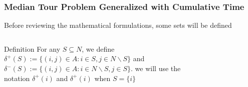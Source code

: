 \documentclass[aspectratio=169]{beamer}
\begin{document}
\begin{frame}
\frametitle{Median Tour Problem Generalized with Cumulative Time}
Before reviewing the mathematical formulations, some sets will be defined
\begin{columns}
\begin{block}{Definition}
For any $S \subseteq N$, we define $\delta^+(S) := \{(i,j) \in A: i \in S, j \in N\backslash S \}$ and $\delta^-(S) := \{(i,j) \in A: i \in N\backslash S, j \in S\}$. we will use the notation $\delta^+(i)$ and $\delta^+(i)$ when $S = \{i\}$
\end{block}
     \begin{figure}[ht]
     \centering
     \end{figure}
\end{columns}
\end{frame}
\end{document}
